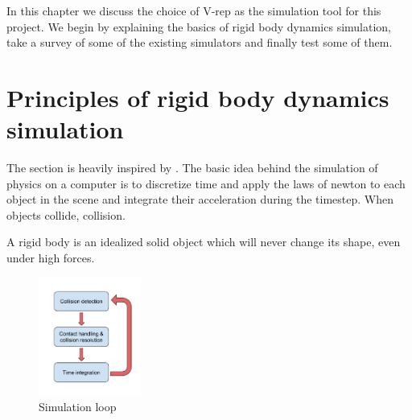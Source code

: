 In this chapter we discuss the choice of V-rep as the simulation tool for this project. We begin by explaining the basics of rigid body dynamics simulation, take a survey of some of the existing simulators and finally test some of them.

\section{Principles of rigid body dynamics simulation}
The section is heavily inspired by \cite{bender2014interactive}.
The basic idea behind the simulation of physics on a computer is to discretize time and apply the laws of newton to each object in the scene and integrate their acceleration during the timestep. When objects collide, collision.

A rigid body is an idealized solid object which will never change its shape, even under high forces.

\begin{figure}[htp]
\center
\includegraphics[width=0.3\textwidth]{figures/star_simul_loop}
\caption[Simulation loop]{Simulation loop}
\label{fig:star_simul_loop}
\end{figure}

